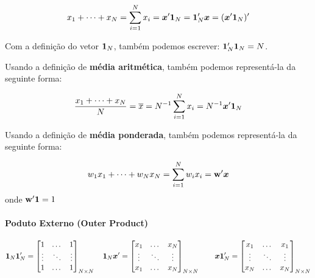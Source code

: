 \documentclass[11pt, oneside, a4paper, article]{article}
\numberwithin{equation}{section}
\begin{document}
\begin{description}
\begin{align*}
	x_{1} + \dots + x_{N} =
	\sum_{i=1}^{N} x_{i} =
	\boldsymbol{x}' \boldsymbol{1}_{N} = 
	\boldsymbol{1}_{N}' \boldsymbol{x} = 
	(\boldsymbol{x}' \boldsymbol{1}_{N})'
\end{align*}

Com a definição do vetor $\boldsymbol{1}_{N}$, também podemos escrever:
$\boldsymbol{1}_{N}' \boldsymbol{1}_{N} = N$.

Usando a definição de \textbf{média aritmética}, também podemos representá-la da seguinte forma:

\begin{align*}
	\frac{x_{1} + \dots + x_{N}}{N} =
	\overline{x} =
	N^{-1} \sum_{i=1}^{N} x_{i} =
	N^{-1} \boldsymbol{x}' \boldsymbol{1}_{N}
\end{align*}

Usando a definição de \textbf{média ponderada}, também podemos representá-la da seguinte forma:

\begin{align*}
	w_{1}x_{1} + \dots + w_{N}x_{N} =
	\sum_{i=1}^{N} w_{i} x_{i} =
	\mathbf{w}'\boldsymbol{x}
\end{align*}
onde $\mathbf{w}'\boldsymbol{1}=1$

\paragraph{Poduto Externo (Outer Product)}

\begin{align*}
	\boldsymbol{1}_{N} \boldsymbol{1}_{N}' =
	\begin{bmatrix}
		1 & \dots & 1	 \\
		\vdots & \ddots & \vdots \\
		1 & \dots & 1	
	\end{bmatrix}_{N \times N}
	\quad
	\boldsymbol{1}_{N} \boldsymbol{x}' =
	\begin{bmatrix}
		x_{1} & \dots & x_{N} \\
		\vdots & \ddots & \vdots \\
		x_{1} & \dots & x_{N}	
	\end{bmatrix}_{N \times N}
	\qquad
	\boldsymbol{x} \boldsymbol{1}_{N}' =
	\begin{bmatrix}
		x_{1} & \dots & x_{1} \\
		\vdots & \ddots & \vdots \\
		x_{N} & \dots & x_{N}	
	\end{bmatrix}_{N \times N}
\end{align*}


\end{description}
\end{document}
